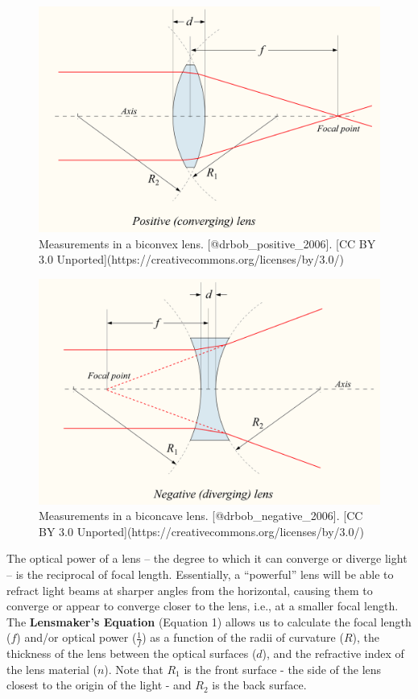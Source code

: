\documentclass[
]{book}
\begin{document}
\begin{figure}
\includegraphics[width=0.9\linewidth]{images/12-convex_focal_diagram} \caption{Measurements in a biconvex lens. [@drbob_positive_2006]. [CC BY 3.0 Unported](https://creativecommons.org/licenses/by/3.0/)}\label{fig:12-convex-focal-diagram}
\end{figure}

\begin{figure}
\includegraphics[width=0.9\linewidth]{images/12-concave_focal_diagram} \caption{Measurements in a biconcave lens. [@drbob_negative_2006]. [CC BY 3.0 Unported](https://creativecommons.org/licenses/by/3.0/)}\label{fig:12-concave-focal-diagram}
\end{figure}

The optical power of a lens -- the degree to which it can converge or diverge light -- is the reciprocal of focal length. Essentially, a ``powerful'' lens will be able to refract light beams at sharper angles from the horizontal, causing them to converge or appear to converge closer to the lens, i.e., at a smaller focal length. The \textbf{Lensmaker's Equation} (Equation 1) allows us to calculate the focal length (\(f\)) and/or optical power (\(\frac{1}{f}\)) as a function of the radii of curvature (\(R\)), the thickness of the lens between the optical surfaces (\(d\)), and the refractive index of the lens material (\(n\)). Note that \(R_1\) is the front surface - the side of the lens closest to the origin of the light - and \(R_2\) is the back surface.
\end{document}
